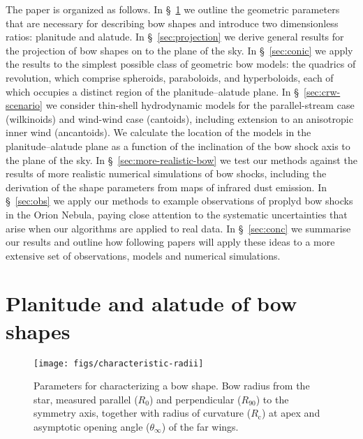 \documentclass[useAMS, usenatbib, a4paper]{mnras}
\newcommand\w{\ensuremath{\mathrm{w}}}
\newcommand\C{\ensuremath{\mathrm{c}}}
\begin{document}
The paper is organized as follows.
%
In \S~\ref{sec:plan-alat-bow} we outline the geometric parameters that
are necessary for describing bow shapes and introduce two
dimensionless ratios: planitude and alatude.
%
In \S~\ref{sec:projection} we derive general results for the
projection of bow shapes on to the plane of the sky.
%
In \S~\ref{sec:conic} we apply the results to the simplest possible
class of geometric bow models: the quadrics of revolution, which
comprise spheroids, paraboloids, and hyperboloids, each of which
occupies a distinct region of the planitude--alatude plane.
%
In \S~\ref{sec:crw-scenario} we consider thin-shell hydrodynamic
models for the parallel-stream case (wilkinoids) and wind-wind case
(cantoids), including extension to an anisotropic inner wind
(ancantoids).  We calculate the location of the models in the
planitude--alatude plane as a function of the inclination of the bow
shock axis to the plane of the sky.
%
In \S~\ref{sec:more-realistic-bow} we test our methods against the
results of more realistic numerical simulations of bow shocks,
including the derivation of the shape parameters from maps of infrared
dust emission.
%
In \S~\ref{sec:obs} we apply our methods to example observations of
proplyd bow shocks in the Orion Nebula, paying close attention to the
systematic uncertainties that arise when our algorithms are applied to
real data.
%
In \S~\ref{sec:conc} we summarise our results and outline how
following papers will apply these ideas to a more extensive set of
observations, models and numerical simulations.



\section{Planitude and alatude of bow shapes}
\label{sec:plan-alat-bow}

\begin{figure}
  \centering
  \texttt{[image: figs/characteristic-radii]}
  \caption[]{Parameters for characterizing a bow shape.  Bow radius
    from the star, measured parallel (\(R_0\)) and perpendicular
    (\(R_{90}\)) to the symmetry axis, together with radius of
    curvature (\(R_{\C}\)) at apex and asymptotic opening angle
    (\(\theta_\infty\)) of the far wings. }
  \label{fig:characteristic-radii}
\end{figure}
\end{document}
